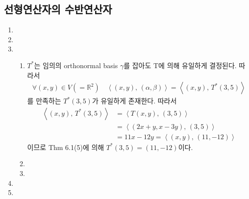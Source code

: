 \documentclass{oblivoir}
\begin{document}
\subsection{선형연산자의 수반연산자}
\begin{enumerate}
    \item 
    \item 
    \item
    \begin{enumerate}
        \item \(T^*\)는 임의의 orthonormal basis \(\gamma\)를 잡아도 T에 의해 유일하게 결정된다. 따라서 
        \begin{align*} \forall(x, y)\in V(=\mathbb{R}^2)\quad\left\langle (x, y),\,(\alpha,\beta) \right\rangle = \left\langle (x, y), \,T^*(3 ,5)\right\rangle \end{align*}
        를 만족하는 \(T^*(3 ,5)\)가 유일하게 존재한다. 따라서
        \begin{equation*}\begin{split}
            \left\langle (x, y), \,T^*(3, 5)\right\rangle & = \left\langle T(x, y),\, (3, 5)\right\rangle \\
            &= \left\langle(2x+y, x-3y), \, (3, 5) \right\rangle\\
            & = 11x-12y = \left\langle (x, y), \, (11, -12)\right\rangle
        \end{split}\end{equation*}
        이므로 Thm 6.1(5)에 의해 \(T^*(3, 5)=(11, -12)\)이다.
        \item 
        \item 
    \end{enumerate}
    \item 
    \item 
\end{enumerate}
\end{document}
